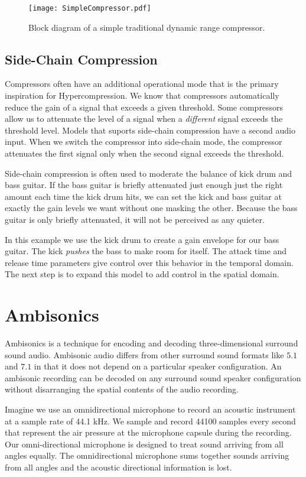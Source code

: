 \begin{figure*}
  \texttt{[image: SimpleCompressor.pdf]}
  \caption{Block diagram of a simple traditional dynamic range
    compressor.}
  \label{fig:comp-block}
\end{figure*}

\subsection{Side-Chain Compression}
\label{sec:side-chain-compr}
Compressors often have an additional operational mode that is the
primary inspiration for Hypercompression. We know that compressors
automatically reduce the gain of a signal that exceeds a given
threshold. Some compressors allow us to attenuate the level of a
signal when a \emph{different} signal exceeds the threshold
level. Models that suports side-chain compression have a second audio
input. When we switch the compressor into side-chain mode, the
compressor attenuates the first signal only when the second signal
exceeds the threshold.

Side-chain compression is often used to moderate the balance of kick
drum and bass guitar. If the bass guitar is briefly attenuated just
enough just the right amount each time the kick drum hits, we can set
the kick and bass guitar at exactly the gain levels we want without
one masking the other. Because the bass guitar is only briefly
attenuated, it will not be perceived as any quieter.

In this example we use the kick drum to create a gain envelope for our
bass guitar. The kick \emph{pushes} the bass to make room for
itself. The attack time and release time parameters give control over
this behavior in the temporal domain. The next step is to
expand this model to add control in the spatial domain.

\section{Ambisonics}
\label{sec:ambisonics}
Ambisonics is a technique for encoding and decoding three-dimensional
surround sound audio.\cite[-15mm]{Gerzon1973,Gerzon1985} Ambisonic
audio differs from other surround sound formats like $5.1$ and $7.1$
in that it does not depend on a particular speaker configuration. An
ambisonic recording can be decoded on any surround sound speaker
configuration without disarranging the spatial contents of the audio
recording.

Imagine we use an omnidirectional microphone to record an acoustic
instrument at a sample rate of 44.1 kHz. We sample and record 44100
samples every second that represent the air pressure at the microphone
capsule during the recording. Our omni-directional microphone is
designed to treat sound arriving from all angles equally. The
omnidirectional microphone sums together sounds arriving from all
angles and the acoustic directional information is lost.

